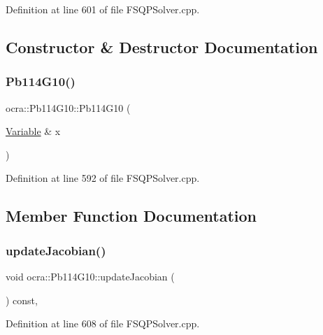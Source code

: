 Definition at line 601 of file F\+S\+Q\+P\+Solver.\+cpp.



\subsection{Constructor \& Destructor Documentation}
\hypertarget{classocra_1_1Pb114G10_a3a99a728ba252d05dd70b24d39dfb643}{}\label{classocra_1_1Pb114G10_a3a99a728ba252d05dd70b24d39dfb643} 
\subsubsection{\texorpdfstring{Pb114\+G10()}{Pb114G10()}}
{\footnotesize\ttfamily ocra\+::\+Pb114\+G10\+::\+Pb114\+G10 (\begin{DoxyParamCaption}\item[{\hyperlink{classocra_1_1Variable}{Variable} \&}]{x }\end{DoxyParamCaption})\hspace{0.3cm}{\ttfamily [inline]}}



Definition at line 592 of file F\+S\+Q\+P\+Solver.\+cpp.



\subsection{Member Function Documentation}
\hypertarget{classocra_1_1Pb114G10_aab79b71d5356edb0cd551158bb9bb93b}{}\label{classocra_1_1Pb114G10_aab79b71d5356edb0cd551158bb9bb93b} 
\subsubsection{\texorpdfstring{update\+Jacobian()}{updateJacobian()}}
{\footnotesize\ttfamily void ocra\+::\+Pb114\+G10\+::update\+Jacobian (\begin{DoxyParamCaption}{ }\end{DoxyParamCaption}) const\hspace{0.3cm}{\ttfamily [inline]}, {\ttfamily [protected]}}



Definition at line 608 of file F\+S\+Q\+P\+Solver.\+cpp.

